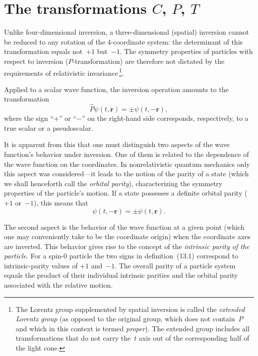 \section{The transformations \texorpdfstring{$C$, $P$, $T$}{C, P, T}}

Unlike four-dimensional inversion, a three-dimensional (spatial) inversion cannot be reduced to any rotation of the 4-coordinate system: the determinant of this transformation equals not~$+1$ but~$-1$. The symmetry properties of particles with respect to inversion ($P$-transformation) are therefore not dictated by the requirements of relativistic invariance\,\footnote{The Lorentz group supplemented by spatial inversion is called the \emph{extended Lorentz group} (as opposed to the original group, which does not contain~$P$ and which in this context is termed \emph{proper}). The extended group includes all transformations that do not carry the~$t$ axis out of the corresponding half of the light cone.}.

Applied to a scalar wave function, the inversion operation amounts to the transformation
\begin{equation}
\hat{P}\psi(t,\mathbf{r}) = \pm\psi(t,-\mathbf{r}),
\tag{13.1}
\end{equation}
where the sign ``$+$'' or ``$-$'' on the right-hand side corresponds, respectively, to a true scalar or a pseudoscalar.

It is apparent from this that one must distinguish two aspects of the wave function's behavior under inversion. One of them is related to the dependence of the wave function on the coordinates. In nonrelativistic quantum mechanics only this aspect was considered---it leads to the notion of the parity of a state (which we shall henceforth call the \emph{orbital parity}), characterizing the symmetry properties of the particle's motion. If a state possesses a definite orbital parity ($+1$ or~$-1$), this means that
\[
\psi(t,-\mathbf{r}) = \pm\psi(t,\mathbf{r}).
\]

The second aspect is the behavior of the wave function at a given point (which one may conveniently take to be the coordinate origin) when the coordinate axes are inverted. This behavior gives rise to the concept of the \emph{intrinsic parity of the particle}. For a spin-0 particle the two signs in definition~(13.1) correspond to intrinsic-parity values of $+1$ and~$-1$. The overall parity of a particle system equals the product of their individual intrinsic parities and the orbital parity associated with the relative motion.

